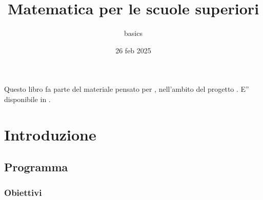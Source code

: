 \documentclass[letterpaper,10pt,italian]{jupyterBook}
\title{Matematica per le scuole superiori}
\date{26 feb 2025}
\author{basics}
\begin{document}
\pagestyle{empty}
\sphinxmaketitle
\pagestyle{plain}
\sphinxtableofcontents
\pagestyle{normal}
\label{\detokenize{intro::doc}}


\sphinxAtStartPar
Questo libro fa parte del materiale pensato per , nell’ambito del progetto . E” disponibile in .



\sphinxAtStartPar
{\hyperref[\detokenize{ch/program:math-hs-intro-how-to}]{}}

\sphinxstepscope


\part{Introduzione}

\sphinxstepscope


\chapter{Programma}
\label{\detokenize{ch/program:programma}}\label{\detokenize{ch/program::doc}}

\section{Obiettivi}
\label{\detokenize{ch/program:obiettivi}}
\end{document}
